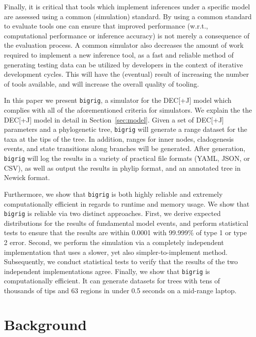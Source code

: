 \documentclass[a4paper]{article}
\newcommand{\bigrig}{\texttt{bigrig}}
\newcommand{\decj}{DEC[+J]}
\begin{document}
Finally, it is critical that tools which implement inferences under a specific model are assessed using a common (simulation) standard.
By using a common standard to evaluate tools one can ensure that improved performance (w.r.t., computational performance or inference accuracy) is not merely a consequence of the evaluation process.
A common simulator also decreases the amount of work required to implement a new inference tool, as a fast and reliable method of generating testing data can be utilized by developers in the context of iterative development cycles.
This will have the (eventual) result of increasing the number of tools available, and will increase the overall quality of tooling.

In this paper we present \bigrig{}, a simulator for the \decj{}  model
which complies with all of the aforementioned criteria for simulators.
We explain the the \decj{} model in detail in Section~\ref{sec:model}.
Given a set of \decj{} parameters and a phylogenetic tree, \bigrig{} will generate a range dataset  for the taxa at the
tips of the tree.
In addition, ranges for inner nodes, cladogenesis events, and state transitions along branches will be generated.
After generation, \bigrig{} will log the results in a variety of practical file formats (YAML, JSON, or CSV), as well as output
the results in phylip format, and an annotated tree in Newick format.

Furthermore, we show that \bigrig{} is both highly reliable and extremely computationally efficient in regards to runtime and memory usage.
We show that \bigrig{} is reliable via two distinct approaches.
First, we derive expected distributions for the results of fundamental model events, and perform statistical
tests to ensure that the results are within 0.0001 with 99.999\% of type 1 or type 2 error.
Second, we perform the simulation via a completely independent implementation that uses a slower, yet also simpler-to-implement
method. 
Subsequently, we conduct statistical tests to verify that the results of the two independent implementations agree.
Finally, we show that \bigrig{} is computationally efficient. 
It can generate datasets for trees with tens of thousands of tips and 63 regions in under 0.5  seconds on a mid-range laptop.

\section{Background}
\end{document}
